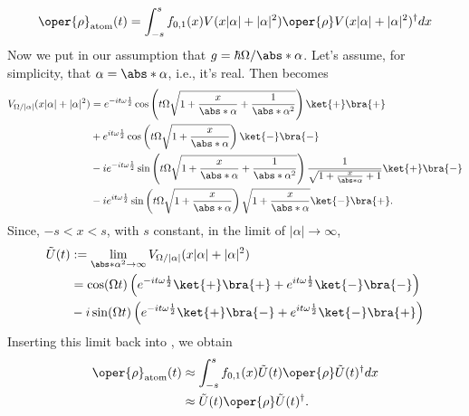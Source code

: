 \begin{equation}
    \label{eq:appen_JCM_rho_atom_t}
    \begin{aligned}
        \oper{\rho}_{\text{atom}}(t)= \int_{-s}^{s} f_{0,1}(x) V(x|\alpha| + |\alpha|^2) 
    \oper{\rho} V(x|\alpha| + |\alpha|^2)^{\dagger} dx
    \end{aligned}
\end{equation}
Now we put in our assumption that \(g = \hbar\Omega / \abs*{\alpha}\). Let's assume, 
for simplicity, that \(\alpha = \abs*{\alpha}\), i.e., it's real. Then  becomes
\begin{align}
    V_{\Omega/|\alpha|}(x|\alpha| + |\alpha|^2) 
    &= e^{-i t \omega \frac{1}{2}}\cos \left( t\Omega \sqrt{1 + \frac{x}{\abs*{\alpha}}+ \frac{1}{\abs*{\alpha}^2}} \right) \ket{+}\bra{+} \nonumber \\
    &+ e^{i t \omega \frac{1}{2} }\cos \left( t\Omega \sqrt{1 + \frac{x}{\abs*{\alpha}}} \right) \ket{-}\bra{-} \nonumber \\
    &- i e^{-i t \omega \frac{1}{2} }\sin \left( t\Omega \sqrt{1 + \frac{x}{\abs*{\alpha}} + \frac{1}{\abs*{\alpha}^2}} \right) \frac{1}{\sqrt{1 + \frac{x}{\abs*{\alpha}} + 1}} \ket{+}\bra{-} \nonumber \\
    &- i e^{i t \omega \frac{1}{2}} \sin \left( t\Omega \sqrt{1 + \frac{x}{\abs*{\alpha}}} \right) \sqrt{1 + \frac{x}{\abs*{\alpha}}} \ket{-}\bra{+}. \nonumber
\end{align}
Since, \(-s < x < s\), with \(s\) constant, in the limit of \(|\alpha| \to \infty\),
\begin{align}
        \label{eq:appen_JCM_V_g_limit}
    \tilde{U}(t) &:= \lim_{\abs*{\alpha}^2 \to \infty} 
    V_{\Omega/|\alpha|}(x|\alpha| + |\alpha|^2)  \nonumber \\
    &= \cos(\Omega t) \left(e^{-i t \omega \frac{1}{2}}\ket{+}\bra{+} + 
    e^{i t \omega \frac{1}{2}}\ket{-}\bra{-} \right)  \nonumber \\
    &- i \sin(\Omega t)
     \left( e^{-i t \omega \frac{1}{2}}\ket{+}\bra{-}
    + e^{i t \omega \frac{1}{2}}\ket{-}\bra{+}\right)  \nonumber \\
\end{align}
Inserting this limit back into , we obtain
\begin{align}
    \oper{\rho}_{\text{atom}}(t) &\approx \int_{-s}^{s} f_{0,1}(x) \tilde{U}(t) \oper{\rho} \tilde{U}(t)^{\dagger} dx \nonumber\\
        &\approx \tilde{U}(t) \oper{\rho} \tilde{U}(t)^{\dagger}.
\end{align}

